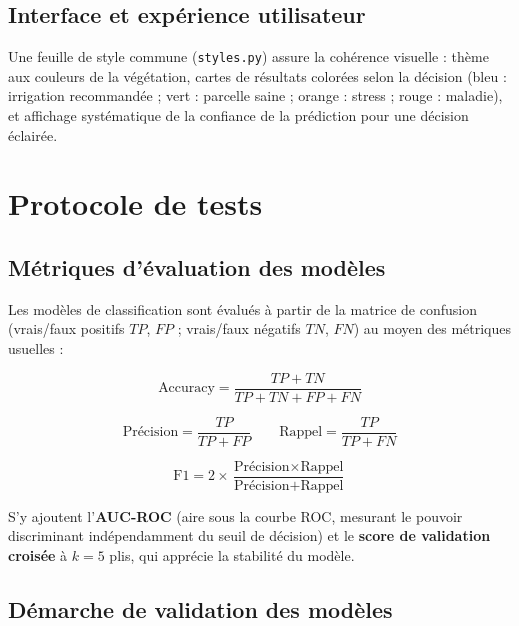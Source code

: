 \subsection{Interface et expérience utilisateur}

Une feuille de style commune (\texttt{styles.py}) assure la
cohérence visuelle : thème aux couleurs de la végétation,
cartes de résultats colorées selon la décision (bleu :
irrigation recommandée ; vert : parcelle saine ; orange :
stress ; rouge : maladie), et affichage systématique de la
confiance de la prédiction pour une décision éclairée.

\section{Protocole de tests}
\label{sec:protocole}

\subsection{Métriques d'évaluation des modèles}

Les modèles de classification sont évalués à partir de la matrice
de confusion (vrais/faux positifs $TP$, $FP$ ; vrais/faux
négatifs $TN$, $FN$) au moyen des métriques usuelles :

\begin{equation}
	\text{Accuracy} = \frac{TP + TN}{TP + TN + FP + FN}
	\label{eq:accuracy}
\end{equation}

\begin{equation}
	\text{Précision} = \frac{TP}{TP + FP}
	\qquad
	\text{Rappel} = \frac{TP}{TP + FN}
	\label{eq:prec_rec}
\end{equation}

\begin{equation}
	\text{F1} = 2 \times
	\frac{\text{Précision} \times \text{Rappel}}
	{\text{Précision} + \text{Rappel}}
	\label{eq:f1}
\end{equation}

S'y ajoutent l'\textbf{AUC-ROC} (aire sous la courbe ROC,
mesurant le pouvoir discriminant indépendamment du seuil de
décision) et le \textbf{score de validation croisée} à $k=5$
plis, qui apprécie la stabilité du modèle.

\subsection{Démarche de validation des modèles}

